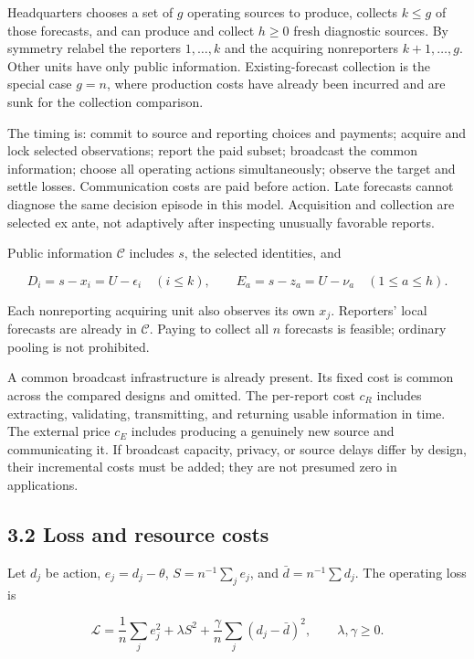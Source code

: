 \documentclass[
  11pt,
]{article}
\begin{document}
Headquarters chooses a set of \(g\) operating sources to produce,
collects \(k\leq g\) of those forecasts, and can produce and collect
\(h\geq0\) fresh diagnostic sources. By symmetry relabel the reporters
\(1,\ldots,k\) and the acquiring nonreporters \(k+1,\ldots,g\). Other
units have only public information. Existing-forecast collection is the
special case \(g=n\), where production costs have already been incurred
and are sunk for the collection comparison.

The timing is: commit to source and reporting choices and payments;
acquire and lock selected observations; report the paid subset;
broadcast the common information; choose all operating actions
simultaneously; observe the target and settle losses. Communication
costs are paid before action. Late forecasts cannot diagnose the same
decision episode in this model. Acquisition and collection are selected
ex ante, not adaptively after inspecting unusually favorable reports.

Public information \(\mathcal C\) includes \(s\), the selected
identities, and

\[D_i=s-x_i=U-\epsilon_i\quad(i\leq k),\qquad
E_a=s-z_a=U-\nu_a\quad(1\leq a\leq h). \tag{1}\]

Each nonreporting acquiring unit also observes its own \(x_j\).
Reporters' local forecasts are already in \(\mathcal C\). Paying to
collect all \(n\) forecasts is feasible; ordinary pooling is not
prohibited.

A common broadcast infrastructure is already present. Its fixed cost is
common across the compared designs and omitted. The per-report cost
\(c_R\) includes extracting, validating, transmitting, and returning
usable information in time. The external price \(c_E\) includes
producing a genuinely new source and communicating it. If broadcast
capacity, privacy, or source delays differ by design, their incremental
costs must be added; they are not presumed zero in applications.

\subsection{3.2 Loss and resource costs}\label{loss-and-resource-costs}

Let \(d_j\) be action, \(e_j=d_j-\theta\), \(S=n^{-1}\sum_j e_j\), and
\(\bar d=n^{-1}\sum d_j\). The operating loss is

\[\mathcal L=\frac1n\sum_j e_j^2+\lambda S^2+
\frac\gamma n\sum_j(d_j-\bar d)^2,\qquad\lambda,\gamma\geq0. \tag{2}\]
\end{document}
